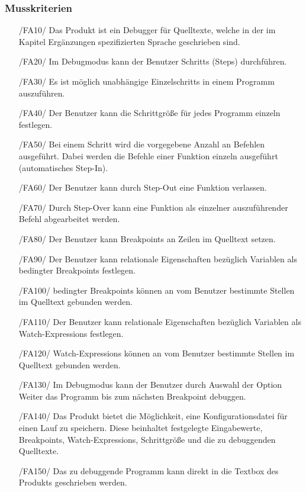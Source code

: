 \documentclass[parskip=full]{scrartcl}
\begin{document}
 		\subsubsection{Musskriterien}
		\begin{itemize}
		\item[/FA10/] Das Produkt ist ein Debugger für Quelltexte, welche in der im Kapitel Ergänzungen spezifizierten Sprache geschrieben sind.
		\item[/FA20/] Im Debugmodus kann der Benutzer \glspl{Schritt} (Steps) durchführen.
		\item[/FA30/] Es ist möglich unabhängige \glspl{Einzelschritt} in einem Programm auszuführen.
		\item[/FA40/] Der Benutzer kann die Schrittgröße für jedes Programm einzeln festlegen.
		\item[/FA50/] Bei einem \gls{Schritt} wird die vorgegebene Anzahl an Befehlen ausgeführt. Dabei werden die Befehle einer Funktion einzeln ausgeführt (automatisches Step-In). 
		\item[/FA60/] Der Benutzer kann durch \gls{Step-Out} eine Funktion verlassen.
		\item[/FA70/] Durch \gls{Step-Over} kann eine Funktion als einzelner auszuführender Befehl abgearbeitet werden.
		\item[/FA80/] Der Benutzer kann \glspl{Breakpoint} an Zeilen im Quelltext setzen.
		\item[/FA90/] Der Benutzer kann relationale Eigenschaften bezüglich Variablen als \glspl{bedingter Breakpoint} festlegen.
		\item[/FA100/] \glspl{bedingter Breakpoint} können an vom Benutzer bestimmte Stellen im Quelltext gebunden werden.
		\item[/FA110/] Der Benutzer kann relationale Eigenschaften bezüglich Variablen als \glspl{Watch-Expression} festlegen.
		\item[/FA120/] \glspl{Watch-Expression} können an vom Benutzer bestimmte Stellen im Quelltext gebunden werden.
		\item[/FA130/] Im \gls{Debugmodus} kann der Benutzer durch Auswahl der Option Weiter das Programm bis zum nächsten Breakpoint debuggen.
		\item[/FA140/] Das Produkt bietet die Möglichkeit, eine \gls{Konfigurationsdatei} für einen Lauf zu speichern. Diese beinhaltet festgelegte Eingabewerte, Breakpoints, Watch-Expressions, Schrittgröße und die zu debuggenden Quelltexte.
		\item[/FA150/] Das zu debuggende Programm kann direkt in die Textbox des Produkts  geschrieben werden.

\end{itemize}
\end{document}
